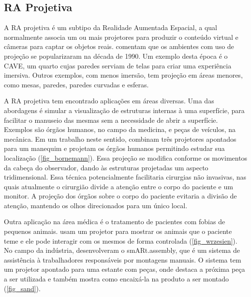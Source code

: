 \subsection{RA Projetiva}
\label{sub_aplicacoes_ra_projetiva}

A RA projetiva é um subtipo da Realidade Aumentada Espacial, a qual normalmente associa um ou mais projetores para produzir o conteúdo virtual e câmeras para captar os objetos reais.  comentam que os ambientes com uso de projeção se popularizaram na década de 1990. Um exemplo desta época é o CAVE, um quarto cujas paredes serviam de telas para criar uma experiência imersiva. Outros exemplos, com menos imersão, tem projeção em áreas menores, como mesas, paredes, paredes curvadas e esferas.

A RA projetiva tem encontrado aplicações em áreas diversas. Uma das abordagens é simular a visualização de estruturas internas à uma superfície, para facilitar o manuseio das mesmas sem a necessidade de abrir a superfície. Exemplos são órgãos humanos, no campo da medicina, e peças de veículos, na mecânica. Em um trabalho neste sentido,  combinam três projetores apontados para um manequim e projetam os órgãos humanos permitindo estudar sua localização (\autoref{fig_bornemann}). Essa projeção se modifica conforme os movimentos da cabeça do observador, dando às estruturas projetadas um aspecto tridimensional. Essa técnica potencialmente facilitaria cirurgias não invasivas, nas quais atualmente o cirurgião divide a atenção entre o corpo do paciente e um monitor. A projeção dos órgãos sobre o corpo do paciente evitaria a divisão de atenção, mantendo os olhos direcionados para um único local.

Outra aplicação na área médica é o tratamento de pacientes com fobias de pequenos animais.  usam um projetor para mostrar os animais que o paciente teme e ele pode interagir com os mesmos de forma controlada (\autoref{fig_wrzesien}). No campo da indústria,  desenvolveram o smARt.assembly, que é um sistema de assistência à trabalhadores responsáveis por montagens manuais. O sistema tem um projetor apontado para uma estante com peças, onde destaca a próxima peça a ser utilizada e também mostra como encaixá-la na produto a ser montado (\autoref{fig_sand}).

